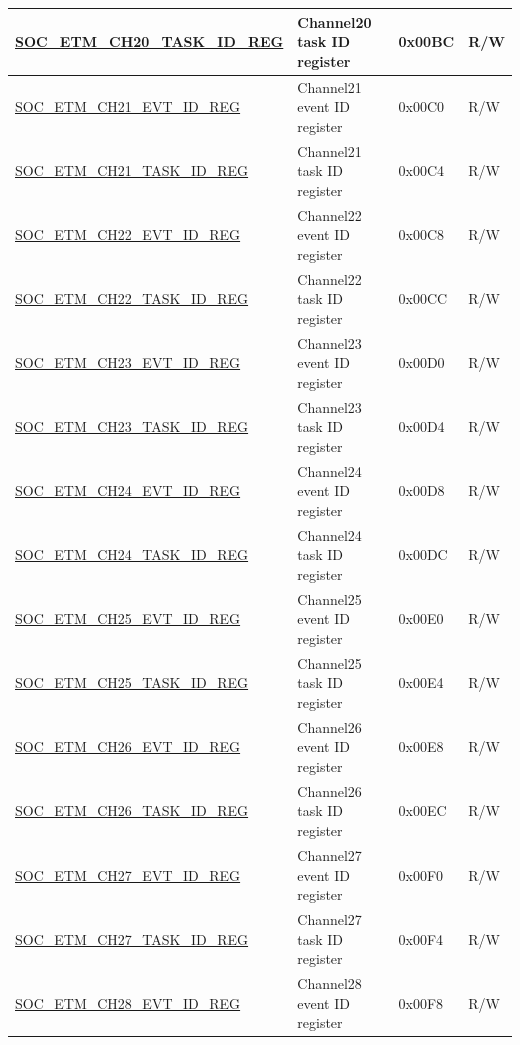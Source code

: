 \begin{longtable}{ | p{6cm} | p{6.4cm} | p{1.3cm} | p{1.8cm} | }
\hyperref[regdesc:SOCETMCH0TASKIDREG]{SOC\_ETM\_CH20\_TASK\_ID\_REG} & Channel20 task ID register & 0x00BC & R/W \\ \hline
\hyperref[regdesc:SOCETMCH0EVTIDREG]{SOC\_ETM\_CH21\_EVT\_ID\_REG} & Channel21 event ID register & 0x00C0 & R/W \\ \hline
\hyperref[regdesc:SOCETMCH0TASKIDREG]{SOC\_ETM\_CH21\_TASK\_ID\_REG} & Channel21 task ID register & 0x00C4 & R/W \\ \hline
\hyperref[regdesc:SOCETMCH0EVTIDREG]{SOC\_ETM\_CH22\_EVT\_ID\_REG} & Channel22 event ID register & 0x00C8 & R/W \\ \hline
\hyperref[regdesc:SOCETMCH0TASKIDREG]{SOC\_ETM\_CH22\_TASK\_ID\_REG} & Channel22 task ID register & 0x00CC & R/W \\ \hline
\hyperref[regdesc:SOCETMCH0EVTIDREG]{SOC\_ETM\_CH23\_EVT\_ID\_REG} & Channel23 event ID register & 0x00D0 & R/W \\ \hline
\hyperref[regdesc:SOCETMCH0TASKIDREG]{SOC\_ETM\_CH23\_TASK\_ID\_REG} & Channel23 task ID register & 0x00D4 & R/W \\ \hline
\hyperref[regdesc:SOCETMCH0EVTIDREG]{SOC\_ETM\_CH24\_EVT\_ID\_REG} & Channel24 event ID register & 0x00D8 & R/W \\ \hline
\hyperref[regdesc:SOCETMCH0TASKIDREG]{SOC\_ETM\_CH24\_TASK\_ID\_REG} & Channel24 task ID register & 0x00DC & R/W \\ \hline
\hyperref[regdesc:SOCETMCH0EVTIDREG]{SOC\_ETM\_CH25\_EVT\_ID\_REG} & Channel25 event ID register & 0x00E0 & R/W \\ \hline
\hyperref[regdesc:SOCETMCH0TASKIDREG]{SOC\_ETM\_CH25\_TASK\_ID\_REG} & Channel25 task ID register & 0x00E4 & R/W \\ \hline
\hyperref[regdesc:SOCETMCH0EVTIDREG]{SOC\_ETM\_CH26\_EVT\_ID\_REG} & Channel26 event ID register & 0x00E8 & R/W \\ \hline
\hyperref[regdesc:SOCETMCH0TASKIDREG]{SOC\_ETM\_CH26\_TASK\_ID\_REG} & Channel26 task ID register & 0x00EC & R/W \\ \hline
\hyperref[regdesc:SOCETMCH0EVTIDREG]{SOC\_ETM\_CH27\_EVT\_ID\_REG} & Channel27 event ID register & 0x00F0 & R/W \\ \hline
\hyperref[regdesc:SOCETMCH0TASKIDREG]{SOC\_ETM\_CH27\_TASK\_ID\_REG} & Channel27 task ID register & 0x00F4 & R/W \\ \hline
\hyperref[regdesc:SOCETMCH0EVTIDREG]{SOC\_ETM\_CH28\_EVT\_ID\_REG} & Channel28 event ID register & 0x00F8 & R/W \\ \hline

\end{longtable}
